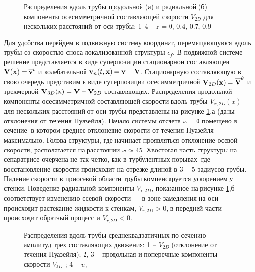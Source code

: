 \begin{figure}[h]
\caption{Распределения вдоль трубы продольной (а) и радиальной (б) компоненты осесимметричной составляющей скорости $V_{2D}$ для нескольких расстояний от оси
трубы: 1–4 – r = 0, 0.4, 0.7, 0.9}
\label{U2D_pic}
\end{figure}

Для удобства перейдем в подвижную систему координат, перемещающуюся вдоль трубы со скоростью сноса локализованной структуры $c_f$. В подвижной системе решение представляется в виде суперпозиции стационарной составляющей $\mathbf{V}(\mathbf{x}) = \overline{\mathbf{v}}^t$ и колебательной $\mathbf{v}_n(t,\mathbf{x}) = \mathbf{v} - \mathbf{V}$. Стационарную составляющую в свою очередь представим в виде суперпозиции осесимметричной $\mathbf{V}_{2D}(\mathbf{x}) = \overline{\mathbf{V}}^{\theta}$ и трехмерной $\mathbf{V}_{3D}(\mathbf{x})=\mathbf{V} - \mathbf{V}_{2D}$ составляющих. Распределения продольной компоненты осесимметричной составляющей скорости вдоль трубы $V_{x,2D}(x)$ для нескольких расстояний от оси трубы представлены на рисунке \ref{U2D_pic},а (даны отклонения от течения Пуазейля). Начало системы отсчета $x=0$ помещено в сечение, в котором среднее отклонение скорости от течения Пуазейля максимально. Голова структуры, где начинает проявляться отклонение осевой скорости, располагается на расстоянии $x \approx 45$. Хвостовая часть структуры на сепаратрисе очерчена не так четко, как в турбулентных порывах, где восстановление скорости происходит на отрезке длиной в $3-5$ радиусов трубы.  Падение скорости в приосевой области трубы компенсируется ускорением у стенки. Поведение радиальной компоненты $V_{r,2D}$, показанное на рисунке \ref{U2D_pic},б соответствует изменению осевой скорости --- в зоне замедления на оси происходит растекание жидкости к стенкам, $V_{r,2D}>0$, в передней части происходит обратный процесс и $V_{r,2D}<0$.


\begin{figure}[h]
\caption{Распределения вдоль трубы среднеквадратичных по сечению амплитуд трех
составляющих движения: 1 – $V_{2D}$ (отклонение от течения Пуазейля); 2, 3 – продольная и поперечные компоненты скорости $V_{3D}$ ; 4 – $v_{n}$}
\label{amp_pic}
\end{figure}


